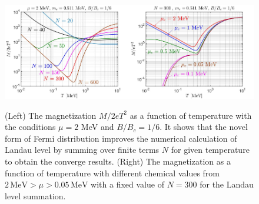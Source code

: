 \documentclass[sn-mathphys,Numbered]{sn-jnl}
\begin{document}
\begin{figure}[ht]
\centering
\includegraphics[width=0.5\textwidth]{./plot/NewFermi_Magnetization_tot003}\includegraphics[width=0.5\textwidth]{./plot/Magnetization_ChemicalPotential}
\caption{(Left) The magnetization $M/2eT^2$ as a function of temperature with the conditions $\mu=2$ MeV and $B/B_c=1/6$. It shows that the novel form of Fermi distribution improves the numerical calculation of Landau level by summing over finite terms $N$ for given temperature to obtain the converge results. (Right) The magnetization as a function of temperature with different chemical values from $2\,\mathrm{MeV}>\mu>0.05\,\mathrm{MeV}$ with a fixed value of $N=300$ for the Landau level summation.}
\label{M_Checking001}
\end{figure}
\end{document}
